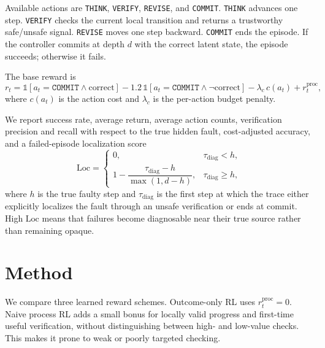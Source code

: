 \documentclass{article}
\begin{document}
Available actions are \texttt{THINK}, \texttt{VERIFY}, \texttt{REVISE}, and \texttt{COMMIT}. \texttt{THINK} advances one step. \texttt{VERIFY} checks the current local transition and returns a trustworthy safe/unsafe signal. \texttt{REVISE} moves one step backward. \texttt{COMMIT} ends the episode. If the controller commits at depth $d$ with the correct latent state, the episode succeeds; otherwise it fails.

The base reward is
\begin{equation}
r_t
= \mathbb{1}\!\left[a_t=\texttt{COMMIT} \wedge \mathrm{correct}\right]
- 1.2\,\mathbb{1}\!\left[a_t=\texttt{COMMIT} \wedge \neg \mathrm{correct}\right]
- \lambda_c \, c(a_t)
+ r_t^{\mathrm{proc}},
\label{eq:reward}
\end{equation}
where $c(a_t)$ is the action cost and $\lambda_c$ is the per-action budget penalty.

We report success rate, average return, average action counts, verification precision and recall with respect to the true hidden fault, cost-adjusted accuracy, and a failed-episode localization score
\begin{equation}
\mathrm{Loc}
=
\begin{cases}
0, & \tau_{\mathrm{diag}} < h,\\
1 - \dfrac{\tau_{\mathrm{diag}} - h}{\max(1, d-h)}, & \tau_{\mathrm{diag}} \ge h,
\end{cases}
\label{eq:loc}
\end{equation}
where $h$ is the true faulty step and $\tau_{\mathrm{diag}}$ is the first step at which the trace either explicitly localizes the fault through an unsafe verification or ends at commit. High $\mathrm{Loc}$ means that failures become diagnosable near their true source rather than remaining opaque.

\section{Method}
We compare three learned reward schemes. Outcome-only RL uses $r_t^{\mathrm{proc}}=0$. Naive process RL adds a small bonus for locally valid progress and first-time useful verification, without distinguishing between high- and low-value checks. This makes it prone to weak or poorly targeted checking.
\end{document}
